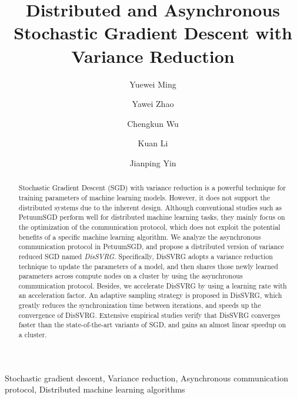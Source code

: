 \documentclass[preprint,review,11pt,a4paper]{elsarticle}
\begin{document}
\begin{frontmatter}

\title{Distributed and Asynchronous Stochastic Gradient Descent with Variance Reduction}

\author[mymainaddress]{Yuewei Ming}

\author[mymainaddress]{Yawei Zhao}
\author[mymainaddress]{Chengkun Wu}
\author[mymainaddress]{Kuan Li}
\author[mysecondaryaddress]{Jianping Yin}
\address[mymainaddress]{College of Computer,\\ National University of Defense Technology, Changsha 410073, China}
\address[mysecondaryaddress]{State Key Laboratory of High Performance Computing,\\ National University of Defense Technology, Changsha, 410073, China}

\begin{abstract}
Stochastic Gradient Descent (SGD) with variance reduction is a powerful technique for training parameters of machine learning models. However, it does not support the distributed systems due to the inherent design.  Although conventional studies such as PetuumSGD perform well for distributed machine learning tasks, they mainly focus on the optimization of the communication protocol, which does not exploit the potential benefits of a specific machine learning algorithm. We analyze the asynchronous communication protocol in PetuumSGD, and propose a distributed version of variance reduced SGD named \emph{DisSVRG}. Specifically, DisSVRG adopts a variance reduction technique to update the parameters of a model, and then shares those newly learned parameters across compute nodes on a cluster by using the asynchronous communication protocol. Besides, we accelerate DisSVRG by using a learning rate with an acceleration factor. An adaptive sampling strategy is proposed in DisSVRG, which greatly reduces the synchronization time between iterations, and speeds up the convergence of DisSVRG. Extensive empirical studies verify that DisSVRG  converges faster than the state-of-the-art variants of SGD, and gains an almost linear speedup on a cluster.
\end{abstract}

\begin{keyword}
Stochastic gradient descent, Variance reduction, Asynchronous communication protocol, Distributed machine learning algorithms
\end{keyword}

\end{frontmatter}
\end{document}

